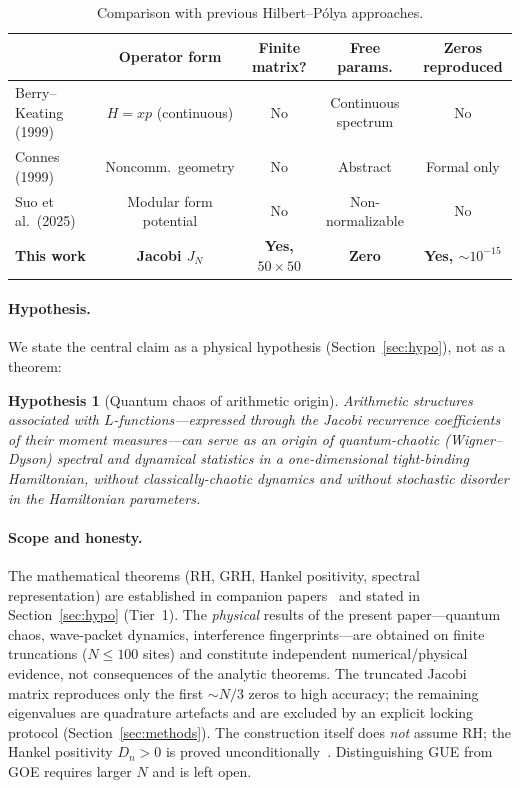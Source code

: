 \documentclass[aps,prx,reprint,floatfix]{revtex4-2}
\newtheorem{hyp}{Hypothesis}
\begin{document}
\begin{table}[t]
\centering
\small
\caption{Comparison with previous Hilbert--P\'olya approaches.}
\label{tab:comparison}
\begin{tabular}{lcccc}
\toprule
 & \textbf{Operator form} & \textbf{Finite matrix?} & \textbf{Free params.} & \textbf{Zeros reproduced} \\
\midrule
Berry--Keating (1999)~\cite{berry1999} & $H=xp$ (continuous) & No & Continuous spectrum & No \\
Connes (1999)~\cite{connes1999} & Noncomm.\ geometry & No & Abstract & Formal only \\
Suo et al.\ (2025)~\cite{suo2025} & Modular form potential & No & Non-normalizable & No \\
\textbf{This work} & \textbf{Jacobi $J_N$} & \textbf{Yes, $50\times50$} & \textbf{Zero} & \textbf{Yes, $\sim10^{-15}$} \\
\bottomrule
\end{tabular}
\end{table}

\paragraph{Hypothesis.}
We state the central claim as a physical hypothesis (Section~\ref{sec:hypo}),
not as a theorem:

\begin{hyp}[Quantum chaos of arithmetic origin]
Arithmetic structures associated with $L$-functions---expressed through the
Jacobi recurrence coefficients of their moment measures---can serve as an
\emph{origin} of quantum-chaotic (Wigner--Dyson) spectral and dynamical
statistics in a one-dimensional tight-binding Hamiltonian, \emph{without}
classically-chaotic dynamics and \emph{without} stochastic disorder in the
Hamiltonian parameters.
\end{hyp}

\paragraph{Scope and honesty.}
The mathematical theorems (RH, GRH, Hankel positivity, spectral
representation) are established in companion papers~\cite{chen2026rh,
chen2026grh} and stated in Section~\ref{sec:hypo} (Tier~1). The
\emph{physical} results of the present paper---quantum chaos, wave-packet
dynamics, interference fingerprints---are obtained on finite truncations
($N\le100$ sites) and constitute independent numerical/physical evidence,
not consequences of the analytic theorems. The truncated Jacobi matrix
reproduces only the first $\sim N/3$ zeros to high accuracy; the remaining
eigenvalues are quadrature artefacts and are excluded by an explicit locking
protocol (Section~\ref{sec:methods}). The construction itself does
\emph{not} assume RH; the Hankel positivity $D_n>0$ is proved
unconditionally~\cite{chen2026rh}. Distinguishing GUE from GOE requires
larger $N$ and is left open.
\end{document}
